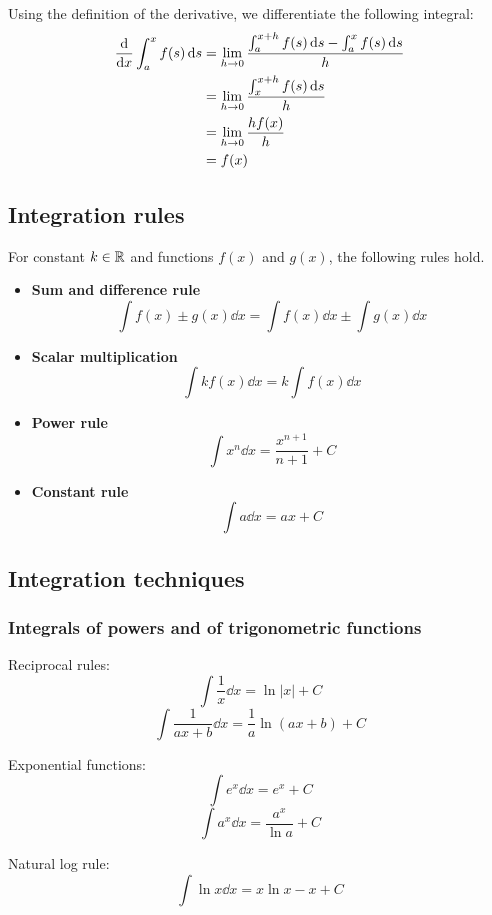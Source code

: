 
Using the definition of the derivative, we differentiate the following integral:
\begin{align*}
\dv{x} \int_{a}^{x} f(s) \dd{s} &= \lim_{h \to 0} \frac{\int_{a}^{x+h} f(s) \dd{s} - \int_{a}^{x} f(s) \dd{s}}{h}\\
&= \lim_{h \to 0} \frac{\int_{x}^{x+h} f(s) \dd{s}}{h}\\
&= \lim_{h \to 0} \frac{h f(x)}{h}\\
&= f(x)
\end{align*}

\subsection{Integration rules}
For constant $k\in\mathbb R$ and functions $f(x)$ and $g(x)$, the following rules hold.
\begin{itemize}
\item \textbf{Sum and difference rule}
\[ \int f(x)\pm g(x) \dd{x} = \int f(x) \dd{x} \pm \int g(x) \dd{x} \]

\item \textbf{Scalar multiplication}
\[ \int kf(x) \dd{x} = k\int f(x) \dd{x} \]

\item \textbf{Power rule}
\[ \int x^n \dd{x} = \frac{x^{n+1}}{n+1} + C \]

\item \textbf{Constant rule}
\[ \int a\dd{x} = ax + C \]
\end{itemize}

\subsection{Integration techniques}
\subsubsection{Integrals of powers and of trigonometric functions}
Reciprocal rules:
\[ \int \frac{1}{x} \dd{x} = \ln|x| + C \]
\[ \int \frac{1}{ax+b} \dd{x} = \frac{1}{a} \ln(ax+b) + C \]

Exponential functions:
\[ \int e^x \dd{x} = e^x + C \]
\[ \int a^{x} \dd{x} = \frac{a^x}{\ln a} + C \]

Natural log rule:
\[ \int \ln x \dd{x} = x\ln x - x + C \]

